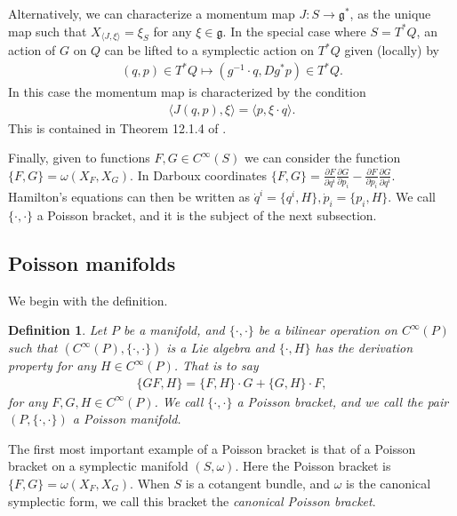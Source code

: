 \documentclass[12pt]{amsart}
\newcommand{\pder}[2]{\ensuremath{\frac{\partial #1}{\partial #2}}}
\newtheorem{defn}[thm]{Definition}
\begin{document}
Alternatively, we can characterize a momentum map $J: S \to \mathfrak{g}^*$, as the unique map such that $X_{\langle J , \xi \rangle} = \xi_S$ for any $\xi \in \mathfrak{g}$.
In the special case where $S = T^*Q$, an action of $G$ on $Q$ can be lifted to a symplectic action on $T^*Q$ given (locally) by
\begin{align*}
  (q,p) \in T^*Q \mapsto (g^{-1} \cdot q , Dg^* p) \in T^*Q.
\end{align*}
In this case the momentum map is characterized by the condition
\begin{align}
  \langle J(q,p) , \xi \rangle = \langle p , \xi \cdot q \rangle.
  \label{eq:cotangent_momap}
\end{align}
This is contained in Theorem 12.1.4 of \cite{MandS}.

Finally, given to functions $F,G \in C^{\infty}(S)$ we can consider the function $\{ F,G\} = \omega( X_F, X_G)$.
In Darboux coordinates $\{ F , G \} = \pder{F}{q^i} \pder{G}{p_i} - \pder{F}{p_i} \pder{G}{q^i}$.
Hamilton's equations can then be written as $\dot{q}^i = \{ q^i , H \},
\dot{p}_i = \{ p_i , H \}$.
We call $\{ \cdot , \cdot \}$ a Poisson bracket, and it is the subject of
the next subsection.

\subsection{Poisson manifolds}
\label{sec:Poisson}
We begin with the definition.

\begin{defn} \label{defn:Poisson}
  Let $P$ be a manifold, and $\{ \cdot , \cdot \}$ be a bilinear
  operation on $C^{\infty}(P)$ such that 
  $( C^{\infty}(P) , \{ \cdot , \cdot \} )$ is a Lie algebra
  and $\{ \cdot , H \}$ has the derivation property for any $H \in C^{\infty}(P)$.
  That is to say
  \begin{align*}
    \{ GF , H \} = \{ F , H \} \cdot G + \{ G , H \} \cdot F,
  \end{align*}
  for any $F,G,H \in C^{\infty}(P)$.
  We call $\{ \cdot , \cdot \}$ a \emph{Poisson bracket},
  and we call the pair $(P, \{ \cdot , \cdot \})$ a Poisson manifold.
\end{defn}

The first most important example of a Poisson bracket is
that of a Poisson bracket on a symplectic manifold $(S,\omega)$.
Here the Poisson bracket is $\{ F , G \} = \omega( X_F , X_G )$.
When $S$ is a cotangent bundle, and $\omega$ is the canonical
symplectic form, we call this bracket the \emph{canonical Poisson
bracket}.
\end{document}
